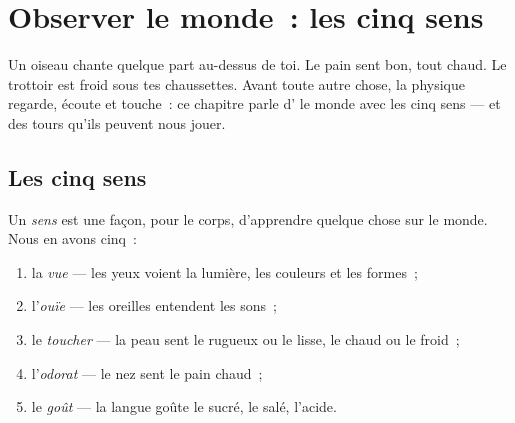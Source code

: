 \chapter{Observer le monde~: les cinq sens}\label{ch:g1:five-senses}

Un oiseau chante quelque part au-dessus de toi. Le pain sent bon,
tout chaud. Le trottoir est froid sous tes chaussettes. Avant toute
autre chose, la physique regarde, écoute et touche~: ce chapitre
parle d' le monde avec les cinq sens --- et des tours qu'ils
peuvent nous jouer.

\section{Les cinq sens}

\begin{definition}\label{def:g1:five-senses:senses}
Un \emph{sens} est une façon, pour le corps, d'apprendre
quelque chose sur le monde. Nous en avons cinq~:
\begin{enumerate}
  \item la \emph{vue} --- les yeux voient la lumière, les
        couleurs et les formes~;
  \item l'\emph{ouïe} --- les oreilles entendent les
        sons~;
  \item le \emph{toucher} --- la peau sent le rugueux
        ou le lisse, le chaud ou le froid~;
  \item l'\emph{odorat} --- le nez sent le pain chaud~;
  \item le \emph{goût} --- la langue goûte le sucré, le
        salé, l'acide.
\end{enumerate}
\end{definition}

